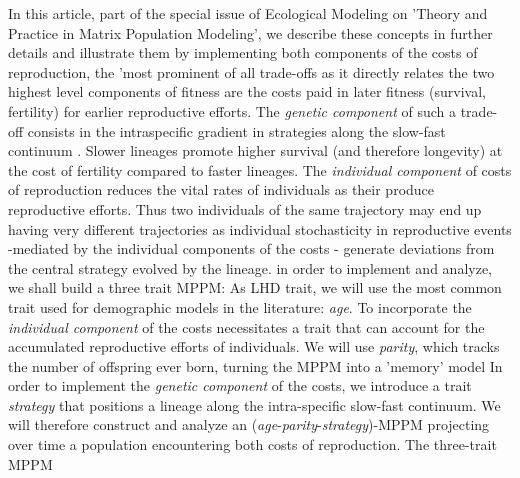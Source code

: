 \documentclass[10pt,a4paper]{article}
\begin{document}
In this article, part of the special issue of Ecological Modeling on 'Theory and Practice in Matrix Population Modeling', we  describe these concepts in further details and illustrate them by implementing both components of the costs of reproduction, 
the 'most prominent of all trade-offs \citep{Stearns1989b} as it directly relates the two highest level components of fitness \citep{Lessells1991} are the costs paid in later fitness (survival, fertility) for earlier reproductive efforts.
The \emph{genetic component} of such a trade-off consists in the intraspecific gradient in strategies along the slow-fast continuum \citep{Gaillard1989,Stearns1983}.  Slower lineages promote higher survival (and therefore longevity) at the cost of fertility compared to faster lineages. 
The \emph{individual component} of costs of reproduction reduces the vital rates of individuals as their produce reproductive efforts.  Thus two individuals of the same trajectory may end up having very different trajectories as individual stochasticity in reproductive events -mediated by the individual components of the costs -   generate deviations from the central strategy evolved by the lineage.
in order to implement and analyze, we shall build a three trait MPPM:   
As LHD trait, we will use the most common trait used for demographic models in the literature: \emph{age}.%
To incorporate the \emph{individual component} of the costs necessitates a trait that can account for the accumulated reproductive efforts of individuals. We will use \emph{parity}, which tracks the number of offspring ever born, turning the MPPM into a 'memory' model \citep{Pavard2012,Coste2017}
In order to implement the \emph{genetic component} of the costs, we introduce a trait \emph{strategy} that positions a lineage along the intra-specific slow-fast continuum.   
We will therefore construct and analyze an (\emph{age}-\emph{parity}-\emph{strategy})-MPPM projecting over time a population encountering both %
costs of reproduction. 
The three-trait MPPM %
\end{document}
